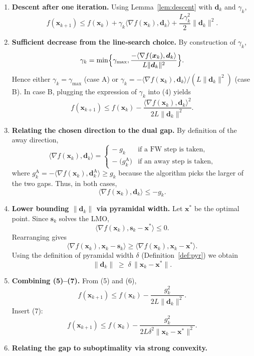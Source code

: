 \documentclass{article}
\begin{document}
\begin{enumerate}[label=[Step \arabic*], leftmargin=*]
\item \textbf{Descent after one iteration.}  
Using Lemma~\ref{lem:descent} with $\bm{d}_{k}$ and $\gamma_{k}$,
\[
f(\bm{x}_{k+1})\le f(\bm{x}_{k})+\gamma_{k}\langle\nabla f(\bm{x}_{k}),\bm{d}_{k}\rangle+\frac{L\gamma_{k}^{2}}{2}\|\bm{d}_{k}\|^{2}. \tag{4}
\]
\item \textbf{Sufficient decrease from the line‑search choice.}  
By construction of $\gamma_{k}$,
\[
\gamma_{k}= \min\Bigl\{\gamma_{\max},
\frac{-\langle\nabla f(\bm{x}_{k}),\bm{d}_{k}\rangle}{L\|\bm{d}_{k}\|^{2}}\Bigr\}.
\]
Hence either $\gamma_{k}=\gamma_{\max}$ (case A) or $\gamma_{k}= -\langle\nabla f(\bm{x}_{k}),\bm{d}_{k}\rangle/(L\|\bm{d}_{k}\|^{2})$ (case B).  
In case B, plugging the expression of $\gamma_{k}$ into (4) yields
\[
f(\bm{x}_{k+1})\le f(\bm{x}_{k})-\frac{\langle\nabla f(\bm{x}_{k}),\bm{d}_{k}\rangle^{2}}{2L\|\bm{d}_{k}\|^{2}}. \tag{5}
\]
\item \textbf{Relating the chosen direction to the dual gap.}  
By definition of the away direction,
\[
\langle\nabla f(\bm{x}_{k}),\bm{d}_{k}\rangle = 
\begin{cases}
-\;g_{k} & \text{if a FW step is taken},\\[4pt]
-\;\bigl(g_{k}^{\text{A}}\bigr) & \text{if an away step is taken},
\end{cases}
\]
where $g_{k}^{\text{A}}=-\langle\nabla f(\bm{x}_{k}),\bm{d}^{\text{A}}_{k}\rangle\ge g_{k}$ because the algorithm picks the larger of the two gaps.  Thus, in both cases,
\[
\langle\nabla f(\bm{x}_{k}),\bm{d}_{k}\rangle\le -g_{k}. \tag{6}
\]
\item \textbf{Lower bounding $\|\bm{d}_{k}\|$ via pyramidal width.}  
Let $\bm{x}^{*}$ be the optimal point.  Since $\bm{s}_{k}$ solves the LMO,
\[
\langle\nabla f(\bm{x}_{k}),\bm{s}_{k}-\bm{x}^{*}\rangle\le 0.
\]
Rearranging gives
\[
\langle\nabla f(\bm{x}_{k}),\bm{x}_{k}-\bm{s}_{k}\rangle \ge 
\langle\nabla f(\bm{x}_{k}),\bm{x}_{k}-\bm{x}^{*}\rangle .
\]
Using the definition of pyramidal width $\delta$ (Definition~\ref{def:pyr}) we obtain
\[
\|\bm{d}_{k}\|\;\ge\; \delta\,\|\bm{x}_{k}-\bm{x}^{*}\| . \tag{7}
\]
\item \textbf{Combining (5)–(7).}  
From (5) and (6),
\[
f(\bm{x}_{k+1})\le f(\bm{x}_{k})-\frac{g_{k}^{2}}{2L\|\bm{d}_{k}\|^{2}}.
\]
Insert (7):
\[
f(\bm{x}_{k+1})\le f(\bm{x}_{k})-\frac{g_{k}^{2}}{2L\delta^{2}\|\bm{x}_{k}-\bm{x}^{*}\|^{2}}. \tag{8}
\]
\item \textbf{Relating the gap to suboptimality via strong convexity.}  

\end{enumerate}
\end{document}
